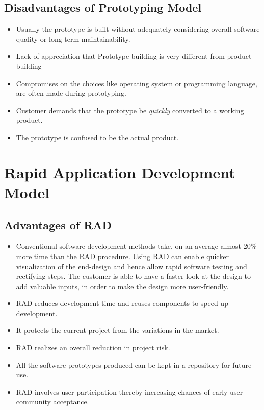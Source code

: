 \documentclass{article}
\begin{document}
\subsection{Disadvantages of Prototyping Model}
\begin{itemize}
\item Usually the prototype is built without adequately considering overall software quality or long-term maintainability.
\item     Lack of appreciation that Prototype building is very different from product building
\item         Compromises on the choices like operating system or programming language, are often made during prototyping.
\item             Customer demands that the prototype be \emph{quickly} converted to a working product.
\item                 The prototype is confused to be the actual product.
\end{itemize}

\newpage{}
\section{Rapid Application Development Model}
\subsection{Advantages of RAD}
\begin{itemize}
\item        Conventional software development methods take, on an average almost 20\% more time than the RAD procedure. Using RAD can enable quicker visualization of the end-design and hence allow rapid software testing and rectifying steps. The customer is able to have a faster look at the design to add valuable inputs, in order to make the design more user-friendly.
\item        RAD reduces development time and reuses components to speed up development.
\item        It protects the current project from the variations in the market.
\item        RAD realizes an overall reduction in project risk.
\item        All the software prototypes produced can be kept in a repository for future use.
\item        RAD involves user participation thereby increasing chances of early user community acceptance.
\end{itemize}
\end{document}
